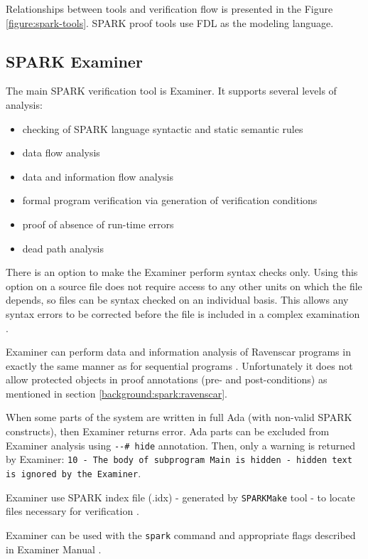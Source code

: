 Relationships between tools and verification flow is presented in the Figure \ref{figure:spark-tools}. SPARK proof tools use FDL as the modeling language. 



\subsection{SPARK Examiner}
\label{background:sparkverification:examiner}

The main SPARK verification tool is Examiner. It supports several levels of analysis:
\begin{itemize}
	\item checking of SPARK language syntactic and static semantic rules
	\item data flow analysis
	\item data and information flow analysis
	\item formal program verification via generation of verification conditions
	\item proof of absence of run-time errors
	\item dead path analysis
\end{itemize}

There is an option to make the Examiner perform syntax checks only. Using this option on a source file does not require access to any other units on which the file depends, so files can be syntax checked on an individual basis. This allows any syntax errors to be corrected before the file is included in a complex examination \cite{Examiner:Online}.

Examiner can perform data and information analysis of Ravenscar programs in exactly the same manner as for sequential programs \cite{Ravenscar:Online}. Unfortunately it does not allow protected objects in proof annotations (pre- and post-conditions) as mentioned in section \ref{background:spark:ravenscar}.

When some parts of the system are written in full Ada (with non-valid SPARK constructs), then Examiner returns error. Ada parts can be excluded from Examiner analysis using \lstinline{--# hide} annotation. Then, only a warning is returned by Examiner: \lstinline{10 - The body of subprogram Main is hidden - hidden text is ignored by the Examiner}.

Examiner use SPARK index file (.idx) - generated by \lstinline{SPARKMake} tool -  to locate files necessary for verification \cite{Barnes:Book}.

Examiner can be used with the \lstinline{spark} command and appropriate flags described in Examiner Manual \cite{Examiner:Online}.

